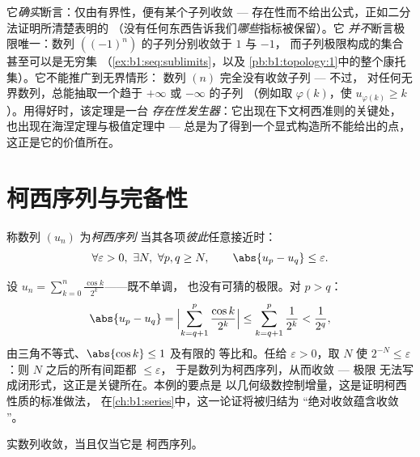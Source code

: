 \begin{remark}
它\emph{确实}断言：仅由有界性，便有某个子列收敛 ---
存在性而不给出公式，正如二分法证明所清楚表明的
（没有任何东西告诉我们\emph{哪些}指标被保留）。它
\emph{并不}断言极限唯一：数列 $((-1)^n)$ 的子列分别收敛于 $1$ 与 $-1$，
而子列极限构成的集合
甚至可以是无穷集
（\cref{ex:b1:seq:sublimits}，以及
\cref{pb:b1:topology:1}中的整个康托集）。它不能推广到无界情形：
数列 $(n)$ 完全没有收敛子列 --- 不过，
对任何无界数列，总能抽取一个趋于 $+\infty$ 或 $-\infty$ 的子列
（例如取 $\varphi(k)$，使
$u_{\varphi(k)} \geq k$）。用得好时，该定理是一台
\emph{存在性发生器}：它出现在下文柯西准则的关键处，
也出现在海涅定理与极值定理中 ---
总是为了得到一个显式构造所不能给出的点，
这正是它的价值所在。
\end{remark}

\section{柯西序列与完备性}

\begin{definition}\label{def:b1:seq:cauchy}
称数列 $(u_n)$ 为\emph{柯西序列}
当其各项\emph{彼此}任意接近时：
\[
\forall \varepsilon > 0,\ \exists N,\ \forall p, q \geq N,
\qquad \abs{u_p - u_q} \leq \varepsilon .
\]
\end{definition}

\begin{example}[用手算验证柯西性质]\label{ex:b1:seq:cauchyhand}
设 $u_n = \sum_{k=0}^{n} \frac{\cos k}{2^k}$------既不单调，
也没有可猜的极限。对 $p > q$：
\[
\abs{u_p - u_q}
= \Bigl| \sum_{k=q+1}^{p} \frac{\cos k}{2^k} \Bigr|
\leq \sum_{k=q+1}^{p} \frac{1}{2^k}
< \frac{1}{2^{q}} ,
\]
由三角不等式、$\abs{\cos k} \leq 1$ 及有限的
等比和。任给 $\varepsilon > 0$，取 $N$ 使 $2^{-N}
\leq \varepsilon$：则 $N$ 之后的所有间距都 $\leq \varepsilon$，
于是数列为柯西序列，从而收敛 --- 极限
无法写成闭形式，这正是关键所在。本例的要点是
以几何级数控制增量，这是证明柯西性质的标准做法，
在\cref{ch:b1:series}中，这一论证将被归结为
“绝对收敛蕴含收敛
”。
\end{example}

\begin{theorem}[$\R$ 的完备性]\label{thm:b1:seq:complete}
实数列收敛，当且仅当它是
柯西序列。
\end{theorem}

